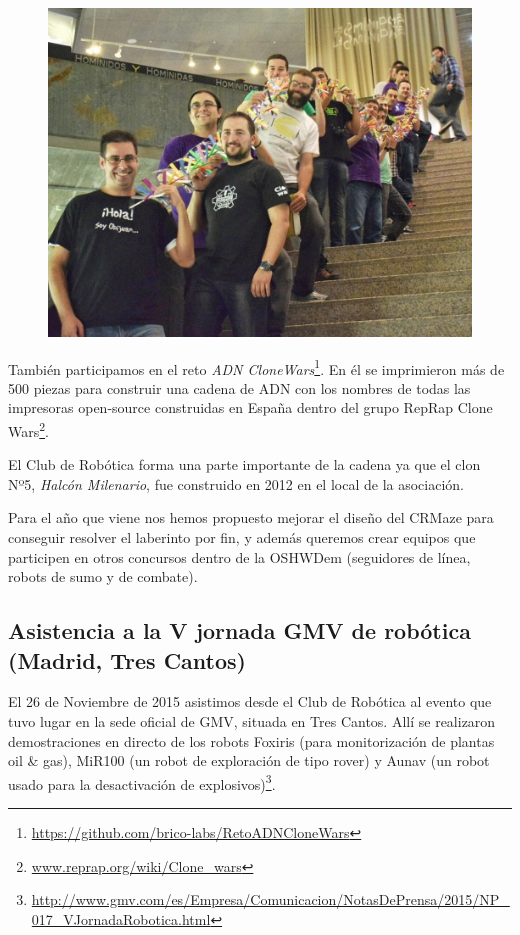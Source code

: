 \documentclass[12pt,twoside]{report}
\begin{document}
\begin{figure}\centering
    \includegraphics[scale=0.2]{fotos/2015_OSHWDem_cadenaADNcloneWars}
    \caption*{}
\end{figure}
También participamos en el reto \emph{ADN CloneWars}\footnote{\url{https://github.com/brico-labs/RetoADNCloneWars}}. En él se imprimieron más de 500 piezas para construir una cadena de ADN con los nombres de todas las impresoras open-source construidas en España dentro del grupo RepRap Clone Wars\footnote{\url{www.reprap.org/wiki/Clone_wars}}.

El Club de Robótica forma una parte importante de la cadena ya que el clon Nº5, \emph{Halcón Milenario}, fue construido en 2012 en el local de la asociación.

Para el año que viene nos hemos propuesto mejorar el diseño del CRMaze para conseguir resolver el laberinto por fin, y además queremos crear equipos que participen en otros concursos dentro de la OSHWDem (seguidores de línea, robots de sumo y de combate).



\subsection{Asistencia a la V jornada GMV de robótica (Madrid, Tres Cantos)}


El 26 de Noviembre de 2015 asistimos desde el Club de Robótica al evento que tuvo lugar en la sede oficial de GMV, situada en Tres Cantos. Allí se realizaron demostraciones en directo de los robots Foxiris (para monitorización de plantas oil \& gas), MiR100 (un robot de exploración de tipo rover) y Aunav (un robot usado para la desactivación de explosivos)\footnote{\tiny\url{http://www.gmv.com/es/Empresa/Comunicacion/NotasDePrensa/2015/NP_017_VJornadaRobotica.html}}.
\end{document}
